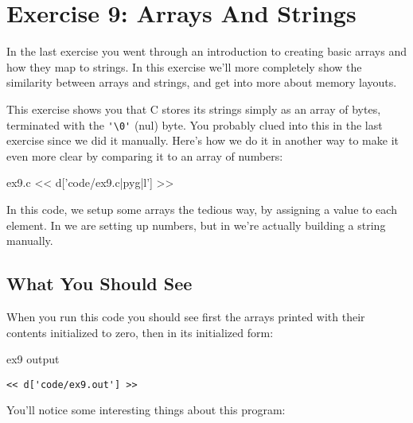 \chapter{Exercise 9: Arrays And Strings}

In the last exercise you went through an introduction to creating basic
arrays and how they map to strings.  In this exercise we'll more completely
show the similarity between arrays and strings, and get into more about
memory layouts.

This exercise shows you that C stores its strings simply as an array
of bytes, terminated with the \verb|'\0'| (nul) byte.  You probably clued
into this in the last exercise since we did it manually.  Here's
how we do it in another way to make it even more clear by comparing it
to an array of numbers:

\begin{code}{ex9.c}
<< d['code/ex9.c|pyg|l'] >>
\end{code}

In this code, we setup some arrays the tedious way, by assigning a value
to each element.  In  we are setting up numbers, but in
 we're actually building a string manually.

\section{What You Should See}

When you run this code you should see first the arrays printed with
their contents initialized to zero, then in its initialized form:

\begin{code}{ex9 output}
\begin{lstlisting}
<< d['code/ex9.out'] >>
\end{lstlisting}
\end{code}

You'll notice some interesting things about this program:

